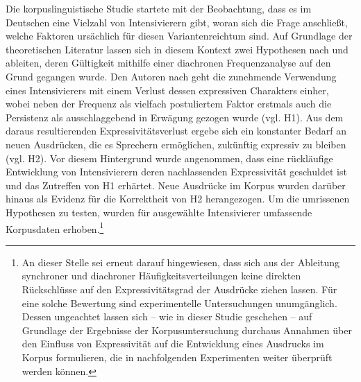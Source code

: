 Die korpuslinguistische Studie startete mit der Beobachtung, dass es im Deutschen eine Vielzahl von Intensivierern gibt, woran sich die Frage anschließt, welche Faktoren ursächlich für diesen Variantenreichtum sind. Auf Grundlage der theoretischen Literatur lassen sich in diesem Kontext zwei Hypothesen nach \citet[2]{Hauschild.1899} und \citet[274]{Baumgarten.1908} ableiten, deren Gültigkeit mithilfe einer diachronen Frequenzanalyse auf den Grund gegangen wurde. Den Autoren nach geht die zunehmende Verwendung eines Intensivierers mit einem Verlust dessen expressiven Charakters einher, wobei neben der Frequenz als vielfach postuliertem Faktor erstmals auch die Persistenz als ausschlaggebend in Erwägung gezogen wurde (vgl. H1). Aus dem daraus resultierenden Expressivitätsverlust ergebe sich ein konstanter Bedarf an neuen Ausdrücken, die es Sprechern ermöglichen, zukünftig expressiv zu bleiben (vgl. H2). Vor diesem Hintergrund wurde angenommen, dass eine rückläufige Entwicklung von Intensivierern deren nachlassenden Expressivität geschuldet ist und das Zutreffen von H1 erhärtet. Neue Ausdrücke im Korpus wurden darüber hinaus als Evidenz für die Korrektheit von H2 herangezogen. Um die umrissenen Hypothesen zu testen, wurden für ausgewählte Intensivierer umfassende Korpusdaten erhoben.\footnote{An dieser Stelle sei erneut darauf hingewiesen, dass sich aus der Ableitung synchroner und diachroner Häufigkeitsverteilungen keine direkten Rückschlüsse auf den Expressivitätsgrad der Ausdrücke ziehen lassen. Für eine solche Bewertung sind experimentelle Untersuchungen unumgänglich. Dessen ungeachtet lassen sich -- wie in dieser Studie geschehen -- auf Grundlage der Ergebnisse der Korpusuntersuchung durchaus Annahmen über den Einfluss von Expressivität auf die Entwicklung eines Ausdrucks im Korpus formulieren, die in nachfolgenden Experimenten weiter überprüft werden können.}
